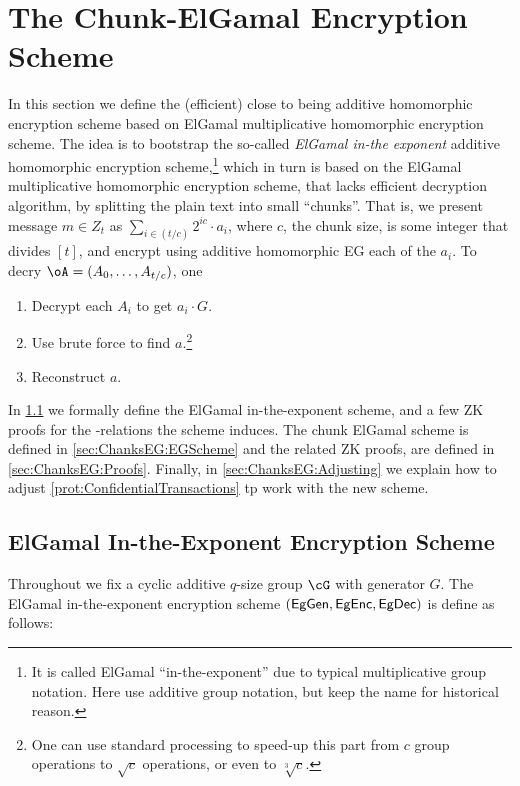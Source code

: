 \section{The Chunk-ElGamal  Encryption Scheme}\label{sec:ChanksEG}
In this section we define the (efficient)  close to being additive homomorphic encryption scheme based on ElGamal multiplicative  homomorphic encryption scheme.  
The idea is to bootstrap the so-called   \textit{ElGamal in-the exponent}   additive homomorphic encryption  scheme,\footnote{It is called ElGamal ``in-the-exponent'' due to typical multiplicative group notation. Here use additive group notation, but keep the name for historical reason.}  which in turn is based on the  ElGamal multiplicative  homomorphic encryption scheme, that lacks efficient decryption algorithm, by splitting the plain text into small ``chunks''. That  is, we present message $m\in Z_t$ as $\sum_{i \in (t/c)}   2^{i c} \cdot a_i$, where $c$, the chunk size, is  some integer that divides $[t]$, and encrypt using    additive homomorphic EG each of the $a_i$. To decry $\oA= (A_0,\ldots,A_{t/c})$, one  
\begin{enumerate}
	\item Decrypt   each $A_i$ to get $a_i  \cdot G$.
	\item Use brute force to find $a$.\footnote{One can use standard   processing to speed-up this part from $c$ group operations to $\sqrt{c}$  operations, or even  to   $\sqrt[3]{c}$.}
	
	\item Reconstruct $a$.
\end{enumerate}
In \cref{sec:ChanksEG:EG} we formally define the ElGamal in-the-exponent scheme, and a few ZK proofs for the \NP-relations the scheme induces. The chunk ElGamal  scheme is defined in \cref{sec:ChanksEG:EGScheme} and the related ZK proofs, are defined in \cref{sec:ChanksEG:Proofs}. Finally, in \cref{sec:ChanksEG:Adjusting} we explain  how to adjust \cref{prot:ConfidentialTransactions} tp work with the new scheme.


\subsection{ElGamal In-the-Exponent Encryption Scheme}\label{sec:ChanksEG:EG}

Throughout we fix a cyclic  additive $q$-size group $\cG$ with generator $G$. The  ElGamal in-the-exponent encryption scheme $(\mathsf{EgGen},\mathsf{EgEnc},\mathsf{EgDec})$ is define as follows:

